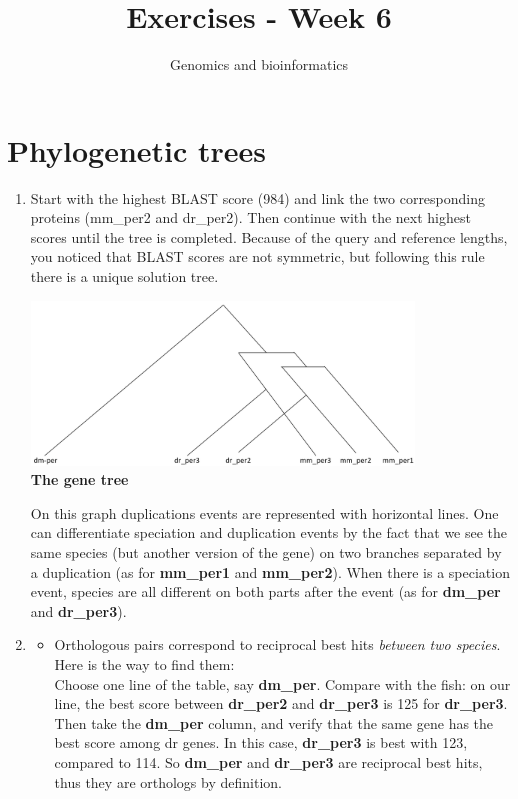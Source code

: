 \documentclass[a4paper,11pt]{article}
\title{Exercises - Week 6}
\date{}
\author{Genomics and bioinformatics}
\begin{document}
\maketitle

\section{Phylogenetic trees}

\begin{enumerate}
\item Start with the highest BLAST score (984) and link the two corresponding proteins (mm\_per2 and dr\_per2). Then continue with the next highest scores until the tree is completed. Because of the query and reference lengths, you noticed that BLAST scores are not symmetric, but following this rule there is a unique solution tree. 

\begin{center}
\includegraphics[width=0.8\textwidth]{tree.png}\\
\vspace{0.5cm}
{\bf The gene tree}
\end{center}

On this graph duplications events are represented with horizontal lines.
One can differentiate speciation and duplication events by the fact that we see the same species (but another version of the gene) on two branches separated by a duplication (as for {\bf mm\_per1} and {\bf mm\_per2}). When there is a speciation event, species are all different on both parts after the event (as for {\bf dm\_per} and {\bf dr\_per3}).

\item 
\begin{itemize}
	\item Orthologous pairs correspond to reciprocal best hits \emph{between two species}. Here is the way to find them:\\
Choose one line of the table, say {\bf dm\_per}. Compare with the fish: on our line, the best score between {\bf dr\_per2} 
and {\bf dr\_per3} is 125 for {\bf dr\_per3}.
Then take the {\bf dm\_per} column, and verify that the same gene has the best score among dr genes. 
In this case, {\bf dr\_per3} is best with 123, compared to 114. So {\bf dm\_per} and {\bf dr\_per3} are reciprocal best hits, thus they are orthologs by definition.


\end{itemize}
\end{enumerate}
\end{document}

